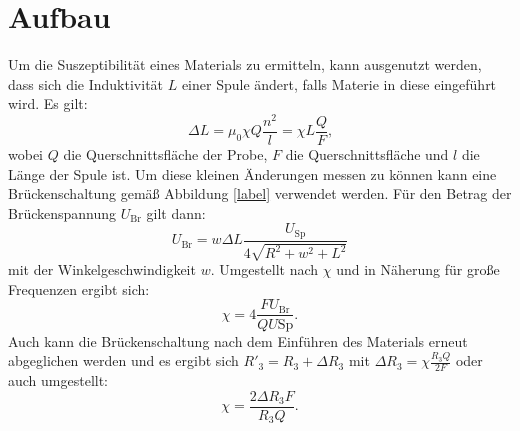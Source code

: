 \section{Aufbau}
\label{sec:Aufbau}

Um die Suszeptibilität eines Materials zu ermitteln, kann ausgenutzt werden, dass sich die Induktivität $L$ einer Spule ändert, falls Materie in diese eingeführt wird. Es gilt:
\begin{equation}
	\Delta L = \mu_0 \chi Q \frac{n^2}{l}=\chi L \frac{Q}{F}\text{,}
\end{equation}
wobei $Q$ die Querschnittsfläche der Probe, $F$ die Querschnittsfläche und $l$ die Länge der Spule ist. Um diese kleinen Änderungen messen zu können kann eine Brückenschaltung gemäß Abbildung \ref{label} verwendet werden. Für den Betrag der Brückenspannung $U_\text{Br}$ gilt dann:
\begin{equation}
	U_\text{Br} = w \Delta L \frac{U_\text{Sp}}{4 \sqrt{R^2+w^2+L^2}}
\end{equation}
mit der Winkelgeschwindigkeit $w$. Umgestellt nach $\chi$ und in Näherung für große Frequenzen ergibt sich:
\begin{equation}
	\chi=4\frac{F U_\text{Br}}{Q U\text{Sp}}\text{.}
\end{equation}
Auch kann die Brückenschaltung nach dem Einführen des Materials erneut abgeglichen werden und es ergibt sich $R'_3 = R_3 + \Delta R_3 $ mit $\Delta R_3 = \chi \frac{R_3 Q}{2 F}$ oder auch umgestellt:
\begin{equation}
	\chi = \frac{2 \Delta R_3 F}{R_3 Q}\text{.}
\end{equation}